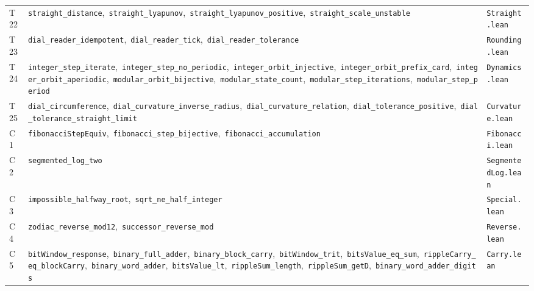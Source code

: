 \documentclass[11pt,a4paper]{article}
\theoremstyle{definition}
\begin{document}
{\begin{longtable}{@{}l>{\raggedright\arraybackslash}p{}l@{}}
T22 & \texttt{straight\_distance},\allowbreak\ \texttt{straight\_lyapunov},\allowbreak\ \texttt{straight\_lyapunov\_positive},\allowbreak\ \texttt{straight\_scale\_unstable} & \texttt{Straight.lean}\\
T23 & \texttt{dial\_reader\_idempotent},\allowbreak\ \texttt{dial\_reader\_tick},\allowbreak\ \texttt{dial\_reader\_tolerance} & \texttt{Rounding.lean}\\
T24 & \texttt{integer\_step\_iterate},\allowbreak\ \texttt{integer\_step\_no\_periodic},\allowbreak\ \texttt{integer\_orbit\_injective},\allowbreak\ \texttt{integer\_orbit\_prefix\_card},\allowbreak\ \texttt{integer\_orbit\_aperiodic},\allowbreak\ \texttt{modular\_orbit\_bijective},\allowbreak\ \texttt{modular\_state\_count},\allowbreak\ \texttt{modular\_step\_iterations},\allowbreak\ \texttt{modular\_step\_period} & \texttt{Dynamics.lean}\\
T25 & \texttt{dial\_circumference},\allowbreak\ \texttt{dial\_curvature\_inverse\_radius},\allowbreak\ \texttt{dial\_curvature\_relation},\allowbreak\ \texttt{dial\_tolerance\_positive},\allowbreak\ \texttt{dial\_tolerance\_straight\_limit} & \texttt{Curvature.lean}\\
C1 & \texttt{fibonacciStepEquiv},\allowbreak\ \texttt{fibonacci\_step\_bijective},\allowbreak\ \texttt{fibonacci\_accumulation} & \texttt{Fibonacci.lean}\\
C2 & \texttt{segmented\_log\_two} & \texttt{SegmentedLog.lean}\\
C3 & \texttt{impossible\_halfway\_root},\allowbreak\ \texttt{sqrt\_ne\_half\_integer} & \texttt{Special.lean}\\
C4 & \texttt{zodiac\_reverse\_mod12},\allowbreak\ \texttt{successor\_reverse\_mod} & \texttt{Reverse.lean}\\
C5 & \texttt{bitWindow\_response},\allowbreak\ \texttt{binary\_full\_adder},\allowbreak\ \texttt{binary\_block\_carry},\allowbreak\ \texttt{bitWindow\_trit},\allowbreak\ \texttt{bitsValue\_eq\_sum},\allowbreak\ \texttt{rippleCarry\_eq\_blockCarry},\allowbreak\ \texttt{binary\_word\_adder},\allowbreak\ \texttt{bitsValue\_lt},\allowbreak\ \texttt{rippleSum\_length},\allowbreak\ \texttt{rippleSum\_getD},\allowbreak\ \texttt{binary\_word\_adder\_digits} & \texttt{Carry.lean}\\
\end{longtable}
}
\end{document}
